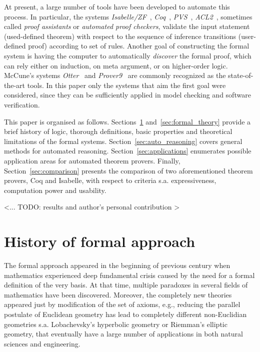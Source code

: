 \documentclass[article]{aaltoseries}
\begin{document}
At present, a large number of tools have been developed to automate this process. In particular, the systems \textit{Isabelle/ZF}~\cite{tool_Isabelle}, \textit{Coq}~\cite{tool_Coq}, \textit{PVS}~\cite{tool_Pvs}, \textit{ACL2}~\cite{tool_Acl}, sometimes called \textit{proof assistants} or \textit{automated proof checkers}, validate the input statement (used-defined theorem) with respect to the sequence of inference transitions (user-defined proof) according to set of rules.
Another goal of constructing the formal system is having the computer to automatically \textit{discover} the formal proof, which can rely either on induction, on meta argument, or on higher-order logic. McCune’s systems \textit{Otter}~\cite{tool_Otter} and \textit{Prover9}~\cite{tool_Prover9} are commonly recognized as the state-of-the-art tools.
In this paper only the systems that aim the first goal were considered, since they can be sufficiently applied in model checking and software verification.

This paper is organised as follows.
Sections~\ref{sec:formal_history} and~\ref{sec:formal_theory} provide a brief history of logic, thorough definitions, basic properties and theoretical limitations of the formal systems. Section~\ref{sec:auto_reasoning} covers general methods for automated reasoning. Section~\ref{sec:applications} enumerates possible application areas for automated theorem provers. Finally, Section~\ref{sec:comparison} presents the comparison of two aforementioned theorem provers, Coq and Isabelle, with respect to criteria s.a. expressiveness, computation power and usability.

<... TODO: results and author's personal contribution >



\section{History of formal approach}
\label{sec:formal_history}

The formal approach appeared in the beginning of previous century when mathematics experienced deep fundamental crisis caused by the need for a formal definition of the very basis. At that time, multiple paradoxes in several fields of mathematics have been discovered. Moreover, the completely new theories appeared just by modification of the set of axioms, e.g., reducing the parallel postulate of Euclidean geometry has lead to completely different non-Euclidian geometries s.a. Lobachevsky's hyperbolic geometry or Riemman's elliptic geometry, that eventually have a large number of applications in both natural sciences and engineering.
\end{document}
